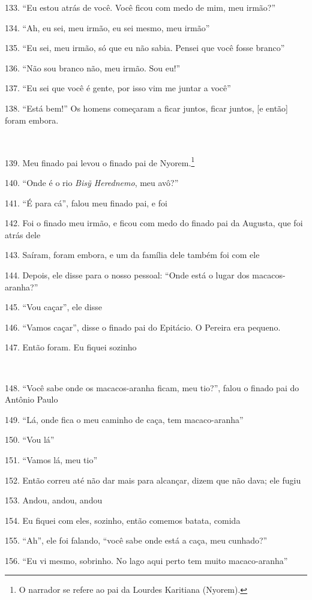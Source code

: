 133. ``Eu estou atrás de você. Você ficou com medo de mim, meu irmão?''

134. ``Ah, eu sei, meu irmão, eu sei mesmo, meu irmão''

135. ``Eu sei, meu irmão, só que eu não sabia. Pensei que você fosse branco''

136. ``Não sou branco não, meu irmão. Sou eu!''

137. ``Eu sei que você é gente, por isso vim me juntar a você''

138. ``Está bem!'' Os homens começaram a ficar juntos, ficar juntos, {[}e então{]} foram embora.

~

139. Meu finado pai levou o finado pai de Nyorem.\footnote{O narrador se
  refere ao pai da Lourdes Karitiana (Nyorem).}

140. ``Onde é o rio \emph{Bisỹ Herednemo}, meu avô?''

141. ``É para cá'', falou meu finado pai, e foi

142. Foi o finado meu irmão, e ficou com medo do finado pai da Augusta,
que foi atrás dele

143. Saíram, foram embora, e um da família dele também foi com ele

144. Depois, ele disse para o nosso pessoal: ``Onde está o lugar dos
macacos- aranha?''

145. ``Vou caçar'', ele disse

146. ``Vamos caçar'', disse o finado pai do Epitácio. O Pereira era pequeno.

147. Então foram. Eu fiquei sozinho

~

148. ``Você sabe onde os macacos-aranha ficam, meu tio?'', falou o finado pai do Antônio Paulo

149. ``Lá, onde fica o meu caminho de caça, tem macaco-aranha''

150. ``Vou lá''

151. ``Vamos lá, meu tio''

152. Então correu até não dar mais para alcançar, dizem que não dava; ele fugiu

153. Andou, andou, andou

154. Eu fiquei com eles, sozinho, então comemos batata, comida

155. ``Ah'', ele foi falando, ``você sabe onde está a caça, meu cunhado?''

156. ``Eu vi mesmo, sobrinho. No lago aqui perto tem muito macaco-aranha''

